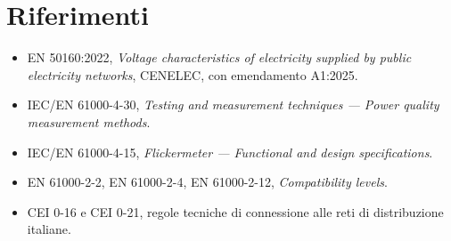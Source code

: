 \documentclass[11pt,a4paper]{article}
\begin{document}
\section*{Riferimenti}

\begin{itemize}[itemsep=2pt]
  \item EN 50160:2022, \textit{Voltage characteristics of electricity supplied by
        public electricity networks}, CENELEC, con emendamento A1:2025.
  \item IEC/EN 61000-4-30, \textit{Testing and measurement techniques ---
        Power quality measurement methods}.
  \item IEC/EN 61000-4-15, \textit{Flickermeter --- Functional and design specifications}.
  \item EN 61000-2-2, EN 61000-2-4, EN 61000-2-12, \textit{Compatibility levels}.
  \item CEI 0-16 e CEI 0-21, regole tecniche di connessione alle reti di distribuzione
        italiane.
\end{itemize}
\end{document}
